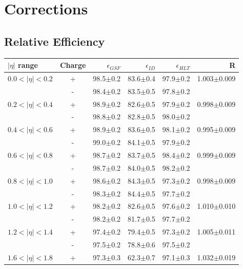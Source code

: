 \section{Corrections}

\subsection{Relative Efficiency}


\begin{table}[htb]
\begin{center}
\begin{tabular}{lcrrrr}
$|\eta|$ range & Charge & $\epsilon_{GSF}$ &$\epsilon_{ID}$&$\epsilon_{HLT}$& R\\
\hline
$0.0<| \eta |<0.2$ &+& 98.5$\pm$0.2 &83.6$\pm$0.4 &97.9$\pm$0.2 &1.003$\pm$0.009\\
                   &-& 98.4$\pm$0.2 &83.5$\pm$0.5 &97.8$\pm$0.2 & \\
$0.2<| \eta |<0.4$ &+& 98.9$\pm$0.2 &82.6$\pm$0.5 &97.9$\pm$0.2 & 0.998$\pm$0.009\\
                   &-& 98.8$\pm$0.2 &82.8$\pm$0.5 &98.0$\pm$0.2 & \\
$0.4<| \eta |<0.6$ &+& 98.9$\pm$0.2&83.6$\pm$0.5 &98.1$\pm$0.2 & 0.995$\pm$0.009\\
                   &-& 99.0$\pm$0.2 &84.1$\pm$0.5 &97.9$\pm$0.2 & \\
$0.6<| \eta |<0.8$ &+& 98.7$\pm$0.2 &83.7$\pm$0.5 &98.4$\pm$0.2 & 0.999$\pm$0.009\\
                   &-& 98.7$\pm$0.2 &84.0$\pm$0.5&98.2$\pm$0.2 & \\
$0.8<| \eta |<1.0$ &+& 98.6$\pm$0.2 &84.3$\pm$0.5 &97.3$\pm$0.2 & 0.998$\pm$0.009\\
                   &-& 98.3$\pm$0.2 &84.4$\pm$0.5 &97.7$\pm$0.2 & \\
$1.0<| \eta |<1.2$ &+& 98.2$\pm$0.2 &82.6$\pm$0.5 &97.6$\pm$0.2 & 1.010$\pm$0.010\\
                   &-& 98.2$\pm$0.2 &81.7$\pm$0.5 &97.7$\pm$0.2 & \\
$1.2<| \eta |<1.4$ &+& 97.4$\pm$0.2 &79.4$\pm$0.5 &97.3$\pm$0.2 & 1.005$\pm$0.011\\
                   &-& 97.5$\pm$0.2 &78.8$\pm$0.6 &97.5$\pm$0.2 & \\
$1.6<| \eta |<1.8$ &+& 97.3$\pm$0.3 &62.3$\pm$0.7 &97.1$\pm$0.3 & 1.032$\pm$0.019\\

\end{tabular}
\end{center}
\end{table}
